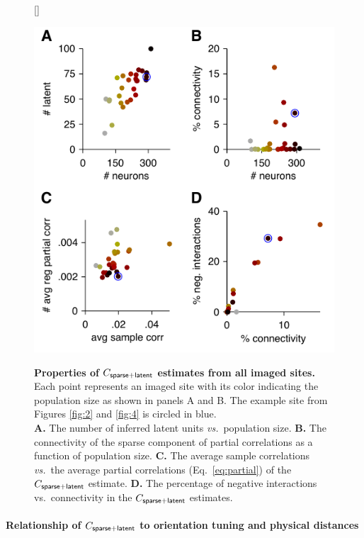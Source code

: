 \documentclass[10pt]{article}
\begin{document}
\begin{figure}    [\FBwidth]
    {\caption{{\bf Properties of $C_{\sf sparse+latent}$ estimates from all imaged sites.} 
    Each point represents an imaged site with its color indicating the population size as shown in panels A and B. The example site from Figures \ref{fig:2} and \ref{fig:4} is circled in blue. 
\\
    {\bf A.} The number of inferred latent units \emph{vs.}~population size.
    {\bf B.} The connectivity of the sparse component of partial correlations as a function of population size.
    {\bf C.} The average sample correlations \emph{vs.}~the average partial correlations (Eq.~\ref{eq:partial}) of the $C_{\sf sparse+latent}$ estimate.
    {\bf D.} The percentage of negative interactions vs.~connectivity in the $C_{\sf sparse+latent}$ estimates.
}
\label{fig:5}}
{\includegraphics{./figures/Figure05.pdf}}
\end{figure}

\paragraph{Relationship of $C_{\sf sparse+latent}$ to orientation tuning and physical distances}
\end{document}
